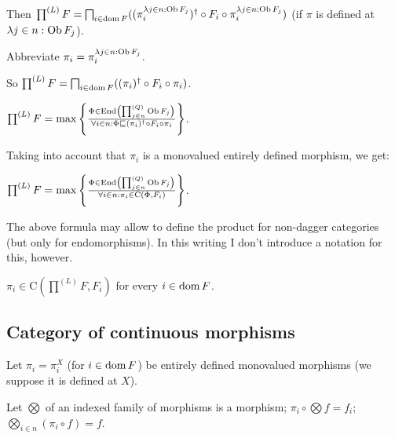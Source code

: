 Then $\prod^{(L)} F = \bigsqcap_{i \in \operatorname{dom} F} ((\pi^{\lambda j \in n :
\operatorname{Ob} F_j}_i)^{\dagger} \circ F_i \circ \pi^{\lambda j \in n : \operatorname{Ob}
F_j}_i)$ (if $\pi$ is defined at $\lambda j \in n : \operatorname{Ob} F_j$).

Abbreviate $\pi_i = \pi^{\lambda j \in n : \operatorname{Ob} F_j}_i$.

So $\prod^{(L)} F = \bigsqcap_{i \in \operatorname{dom} F} ((\pi_i)^{\dagger} \circ
F_i \circ \pi_i)$.

$\prod^{(L)} F = \max \left\{ \frac{ \Phi \in \operatorname{End} \left( \prod^{(Q)}_{j \in n}
\operatorname{Ob} F_j \right) }{ \forall i \in n : \Phi
\sqsubseteq (\pi_i)^{\dagger} \circ F_i \circ \pi_i }\right\}$.

Taking into account that $\pi_i$ is a monovalued entirely defined morphism, we
get:

\begin{obvious}
$\prod^{(L)} F = \max \left\{ \frac{ \Phi \in \operatorname{End} \left( \prod^{(Q)}_{j \in
n} \operatorname{Ob} F_j \right) }{ \forall i \in n : \pi_i
\in \mathrm{C} (\Phi , F_i) }\right\}$.
\end{obvious}

\begin{rem}
  The above formula may allow to define the product for non-dagger categories
  (but only for endomorphisms). In this writing I don't introduce a notation
  for this, however.
\end{rem}

\begin{cor}
  $\pi_i \in \mathrm{C} \left( \prod^{(L)} F , F_i \right)$ for every $i \in
  \operatorname{dom} F$.
\end{cor}

\subsection{Category of continuous morphisms}

Let $\pi_i = \pi_i^X$ (for $i \in \operatorname{dom} F$) be entirely defined
monovalued morphisms (we suppose it is defined at $X$).

Let $\bigotimes$ of an indexed family of morphisms is a morphism; $\pi_i \circ
\bigotimes f = f_i$; $\bigotimes_{i \in n} (\pi_i \circ f) = f$.


